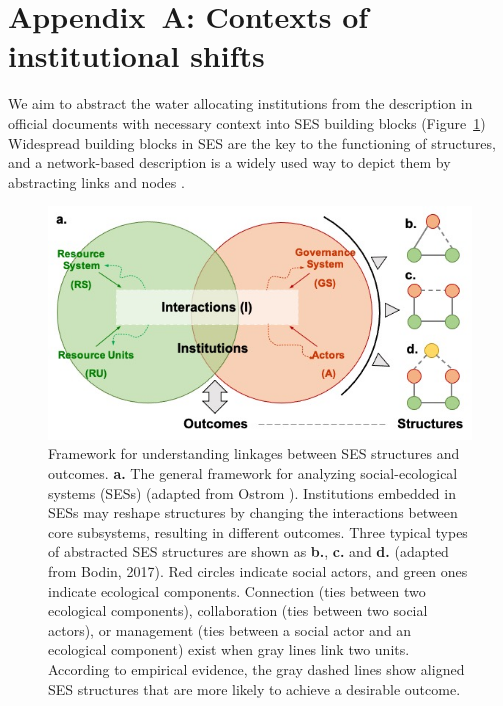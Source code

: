 \documentclass[default, sn-standardnature]{sn-jnl} %
\providecommand{\DIFaddbegin}{} %
\providecommand{\DIFaddend}{} %
\providecommand{\DIFdelbegin}{} %
\providecommand{\DIFaddbeginFL}{} %
\providecommand{\DIFaddendFL}{} %
\providecommand{\DIFdelendFL}{} %
\newcommand{\DIFscaledelfig}{0.5}
\newlength{\DIFdelgraphicswidth} %
\newlength{\DIFdelgraphicsheight} %
\newcommand{\DIFaddincludegraphics}[2][]{{\color{blue}\fbox{\DIFOincludegraphics[#1]{#2}}}} %
\newcommand{\DIFdelincludegraphics}[2][]{%
\sbox{\DIFdelgraphicsbox}{\DIFOincludegraphics[#1]{#2}}%
\settoboxwidth{\DIFdelgraphicswidth}{\DIFdelgraphicsbox} %
\settoboxtotalheight{\DIFdelgraphicsheight}{\DIFdelgraphicsbox} %
\scalebox{\DIFscaledelfig}{%
\parbox[b]{\DIFdelgraphicswidth}{\usebox{\DIFdelgraphicsbox}\\[-\baselineskip] \rule{\DIFdelgraphicswidth}{0em}}\llap{\resizebox{\DIFdelgraphicswidth}{\DIFdelgraphicsheight}{%
\setlength{\unitlength}{\DIFdelgraphicswidth}%
\begin{picture}(1,1)%
\thicklines\linethickness{2pt} %
{\color[rgb]{1,0,0}\put(0,0){\framebox(1,1){}}}%
{\color[rgb]{1,0,0}\put(0,0){\line( 1,1){1}}}%
{\color[rgb]{1,0,0}\put(0,1){\line(1,-1){1}}}%
\end{picture}%
}\hspace*{3pt}}} %
} %
\DeclareRobustCommand{\DIFaddbegin}{\DIFOaddbegin \let\includegraphics\DIFaddincludegraphics} %
\DeclareRobustCommand{\DIFaddend}{\DIFOaddend \let\includegraphics\DIFOincludegraphics} %
\DeclareRobustCommand{\DIFdelbegin}{\DIFOdelbegin \let\includegraphics\DIFdelincludegraphics} %
\DeclareRobustCommand{\DIFaddbeginFL}{\DIFOaddbeginFL \let\includegraphics\DIFaddincludegraphics} %
\DeclareRobustCommand{\DIFaddendFL}{\DIFOaddendFL \let\includegraphics\DIFOincludegraphics} %
\DeclareRobustCommand{\DIFdelendFL}{\DIFOaddendFL \let\includegraphics\DIFOincludegraphics} %
\begin{document}

\label{bib}

\DIFaddend %
\DIFaddbegin \newpage
\DIFaddend \appendix
\label{appendix}
\renewcommand{\figurename}{Supplementary Figure}
\renewcommand{\appendixname}{Appendix~\Alph{section}}
\setcounter{section}{0}

\section{Appendix~A: Contexts of institutional shifts}\label{secS1}
\renewcommand{\thefigure}{A\arabic{figure}}
\renewcommand{\thetable}{A\arabic{table}}
\setcounter{figure}{0}
\setcounter{table}{0}

We aim to abstract the water allocating institutions from the description in official documents with necessary context into SES building blocks (Figure~\ref{framework})
Widespread building blocks in SES are the key to the functioning of structures, and a network-based description is a widely used way to depict them by abstracting links and nodes \cite{bodin2017a,kluger2020,guerrero2015}.

\DIFdelbegin %
\DIFdelendFL \DIFaddbeginFL \begin{figure}[!bh]
	\DIFaddendFL \centering
	\includegraphics[width=0.9\linewidth]{diagrams/framework.jpg}
	\caption{
		Framework for understanding linkages between SES structures and outcomes.
		\textbf{a.} The general framework for analyzing social-ecological systems (SESs) (adapted from Ostrom \cite{ostrom2009}). Institutions embedded in SESs may reshape structures by changing the interactions between core subsystems, resulting in different outcomes.
        Three typical types of abstracted SES structures are shown as \textbf{b.}, \textbf{c.} and \textbf{d.} (adapted from Bodin, 2017)\cite{bodin2017b}. Red circles indicate social actors, and green ones indicate ecological components. Connection (ties between two ecological components), collaboration (ties between two social actors), or management (ties between a social actor and an ecological component) exist when gray lines link two units. According to empirical evidence, the gray dashed lines show aligned SES structures that are more likely to achieve a desirable outcome.
        }
    \label{framework}
\end{figure}
\end{document}
